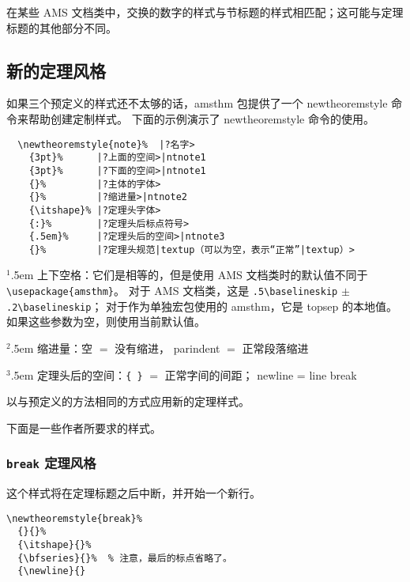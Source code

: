 \documentclass{article}
\newcommand{\ntt}{%
  \fontfamily\ttdefault \fontseries\mddefault \fontshape\updefault
  \selectfont
}
\DeclareRobustCommand{\cn}[1]{{\ntt\bslchar#1}}
\DeclareRobustCommand{\pkg}[1]{\textsf{#1}}
\def\ntnote#1{{\normalfont$^{#1}$}\hangindent.5em}
\begin{document}
在某些 AMS 文档类中，交换的数字的样式与节标题的样式相匹配；这可能与定理标题的其他部分不同。



\enlargethispage{1\baselineskip} %
\subsection{新的定理风格}

如果三个预定义的样式还不太够的话，\pkg{amsthm} 包提供了一个 \cn{newtheoremstyle} 命令来帮助创建定制样式。
下面的示例演示了 \cn{newtheoremstyle} 命令的使用。
\begin{verbatim}
  \newtheoremstyle{note}%  |?名字>
    {3pt}%      |?上面的空间>|ntnote1
    {3pt}%      |?下面的空间>|ntnote1
    {}%         |?主体的字体>
    {}%         |?缩进量>|ntnote2
    {\itshape}% |?定理头字体>
    {:}%        |?定理头后标点符号>
    {.5em}%     |?定理头后的空间>|ntnote3
    {}%         |?定理头规范|textup（可以为空，表示“正常”|textup）>
\end{verbatim}
\noindent
\ntnote1 上下空格：它们是相等的，但是使用 AMS 文档类时的默认值不同于 \texttt{\textbackslash usepackage\{amsthm\}}。
对于 AMS 文档类，这是 \verb+.5\baselineskip+ $\pm$ \texttt{.2\textbackslash baselineskip}；
对于作为单独宏包使用的 \pkg{amsthm}，它是 \cn{topsep} 的本地值。如果这些参数为空，则使用当前默认值。

\noindent
\ntnote2 缩进量：空 $=$ 没有缩进，\cn{parindent} $=$ 正常段落缩进

\noindent
\ntnote3 定理头后的空间：\verb+{ }+ $=$ 正常字间的间距；%
 \cn{newline} = line break

\smallskip
以与预定义的方法相同的方式应用新的定理样式。

下面是一些作者所要求的样式。

\subsubsection{\texttt{break} 定理风格}
\label{thmstyle:break}
这个样式将在定理标题之后中断，并开始一个新行。
\begin{verbatim}
\newtheoremstyle{break}%
  {}{}%
  {\itshape}{}%
  {\bfseries}{}%  % 注意，最后的标点省略了。
  {\newline}{}
\end{verbatim}
\end{document}
